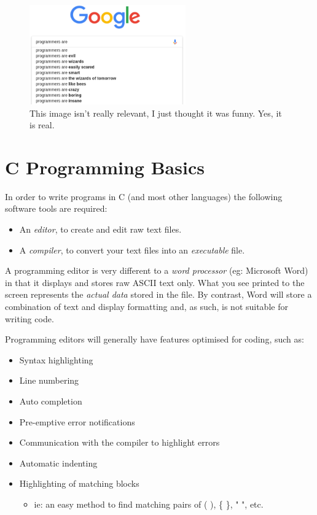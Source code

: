 \documentclass{lab}
\begin{document}
\begin{figure}[H]
\begin{center}
\includegraphics[width=0.6\textwidth]{google.png}
\end{center}
\caption{This image isn't really relevant, I just thought it was funny. Yes, it is real.}
\end{figure}

\pagebreak
\tableofcontents

\pagebreak
\section{C Programming Basics}
In order to write programs in C (and most other languages) the following software tools are required:

\begin{itemize}
\item An \textit{editor}, to create and edit raw text files.
\item A \textit{compiler}, to convert your text files into an \textit{executable} file.
\end{itemize}

A programming editor is very different to a \textit{word processor} (eg: Microsoft Word) in that it displays and stores raw ASCII text only. What you see printed to the screen represents the \textit{actual data} stored in the file. By contrast, Word will store a combination of text and display formatting and, as such, is not suitable for writing code.

Programming editors will generally have features optimised for coding, such as:

\begin{itemize}
\item Syntax highlighting
\item Line numbering
\item Auto completion
\item Pre-emptive error notifications
\item Communication with the compiler to highlight errors
\item Automatic indenting
\item Highlighting of matching blocks 
	\begin{itemize}
		\item ie: an easy method to find matching pairs of ( ), \{ \}, " ", etc.
	\end{itemize}
\end{itemize}
\end{document}
